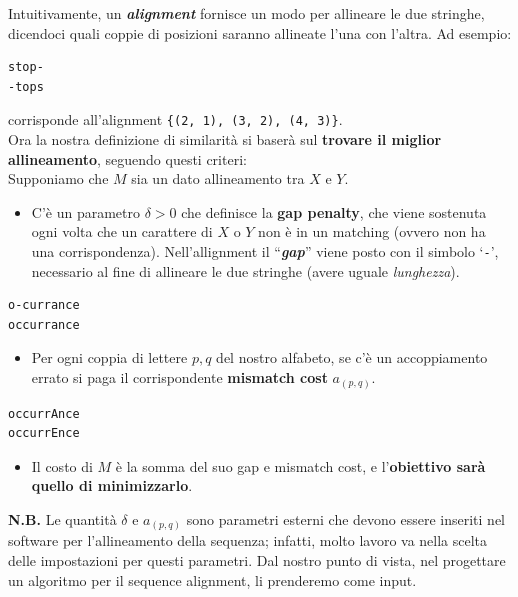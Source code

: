 Intuitivamente, un \textbf{\emph{alignment}} fornisce un modo per
allineare le due stringhe, dicendoci quali coppie di posizioni saranno
allineate l'una con l'altra. Ad esempio:

\begin{verbatim}
stop-
-tops
\end{verbatim}

corrisponde all'alignment \texttt{\{(2,\ 1),\ (3,\ 2),\ (4,\ 3)\}}.\\

Ora la nostra definizione di similarità si baserà sul \textbf{trovare il
  miglior allineamento}, seguendo questi criteri:\\

Supponiamo che $M$ sia un dato allineamento tra $X$ e $Y$.

\begin{itemize}
  \item
        C'è un parametro $\delta>0$ che definisce la \textbf{gap penalty},
        che viene sostenuta ogni volta che un carattere di $X$ o $Y$ non è
        in un matching (ovvero non ha una corrispondenza). Nell'allignment il
        ``\textbf{\emph{gap}}'' viene posto con il simbolo `\texttt{-}',
        necessario al fine di allineare le due stringhe (avere uguale
        \emph{lunghezza}).
\end{itemize}

\begin{verbatim}
o-currance
occurrance
\end{verbatim}

\begin{itemize}
  \item
        Per ogni coppia di lettere $p,q$ del nostro alfabeto, se c'è un
        accoppiamento errato si paga il corrispondente \textbf{mismatch cost}
        $a_{(p,q)}$.
\end{itemize}

\begin{verbatim}
occurrAnce
occurrEnce
\end{verbatim}

\begin{itemize}
  \item
        Il costo di $M$ è la somma del suo gap e mismatch cost, e
        l'\textbf{obiettivo sarà quello di minimizzarlo}.
\end{itemize}

\textbf{N.B.} Le quantità $\delta$ e $a_{(p,q)}$ sono parametri
esterni che devono essere inseriti nel software per l'allineamento della
sequenza; infatti, molto lavoro va nella scelta delle impostazioni per
questi parametri. Dal nostro punto di vista, nel progettare un algoritmo
per il sequence alignment, li prenderemo come input.

